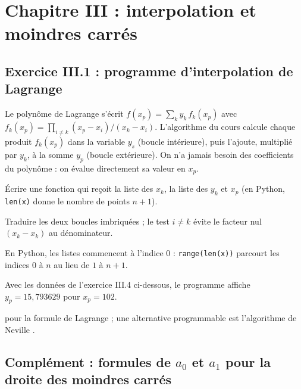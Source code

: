 \chapter{Chapitre III : interpolation et moindres carrés}

\section{Exercice III.1 : programme d'interpolation de Lagrange}


\Pourquoi Le polynôme de Lagrange s'écrit
$f(x_p) = \sum_k y_k\,f_k(x_p)$ avec
$f_k(x_p) = \prod_{i \ne k}(x_p - x_i)/(x_k - x_i)$. L'algorithme du cours
calcule chaque produit $f_k(x_p)$ dans la variable $y_s$ (boucle intérieure),
puis l'ajoute, multiplié par $y_k$, à la somme $y_p$ (boucle extérieure). On
n'a jamais besoin des coefficients du polynôme : on évalue directement sa
valeur en $x_p$.

\Etapes
{} Écrire une fonction qui reçoit la liste des $x_k$, la liste des $y_k$
et $x_p$ (en Python, \texttt{len(x)} donne le nombre de points $n+1$).

 Traduire les deux boucles imbriquées ; le test $i \ne k$ évite le
facteur nul $(x_k - x_k)$ au dénominateur.

 En Python, les listes commencent à l'indice 0 :
\texttt{range(len(x))} parcourt les indices $0$ à $n$ au lieu de $1$ à $n+1$.


\Verif Avec les données de l'exercice III.4 ci-dessous, le programme affiche
$y_p = 15{,}793629$ pour $x_p = 102$.

\Refs {} pour la formule de Lagrange ; une alternative
programmable est l'algorithme de Neville .

\section{\texorpdfstring{Complément : formules de $a_0$ et $a_1$ pour la droite des moindres
carrés}{Complément : formules de a0 et a1 pour la droite des moindres carrés}}


